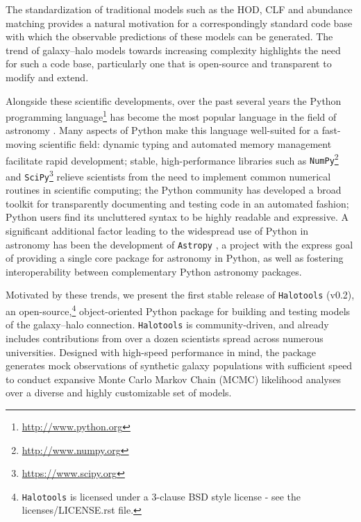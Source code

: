 \documentclass[twocolumn, tighten]{aastex6}
\begin{document}
The standardization of traditional models such as the HOD, CLF and abundance matching provides a natural motivation for a correspondingly standard code base with which the observable predictions of these models can be generated. The trend of galaxy--halo models towards increasing complexity highlights the need for such a code base, particularly one that is open-source and transparent to modify and extend.

Alongside these scientific developments, over the past several years the Python programming language\footnote{\url{http://www.python.org}} has become the most popular language in the field of astronomy \citep{momcheva_tollerud15}. Many aspects of Python make this language well-suited for a fast-moving scientific field: dynamic typing and automated memory management facilitate rapid development; stable, high-performance libraries such as {\tt NumPy}\footnote{\url{http://www.numpy.org}} \citep{numpy_array} and {\tt SciPy}\footnote{\url{https://www.scipy.org}} \citep{scipy} relieve scientists from the need to implement common numerical routines in scientific computing; the Python community has developed a broad toolkit for transparently documenting and testing code in an automated fashion; Python users find its uncluttered syntax to be highly readable and expressive. A significant additional factor leading to the widespread use of Python in astronomy has been the development of  {\tt Astropy} \citep{astropy}, a project with the express goal of providing a single core package for astronomy in Python, as well as fostering interoperability between complementary Python astronomy packages.

Motivated by these trends, we present the first stable release of {\tt Halotools} (v0.2), an open-source,\footnote{{\tt Halotools} is licensed under a 3-clause BSD style license - see the licenses/LICENSE.rst file.} object-oriented Python package for building and testing models of the galaxy--halo connection. {\tt Halotools} is community-driven, and already includes contributions from over a dozen scientists spread across numerous universities. Designed with high-speed performance in mind, the package generates mock observations of synthetic galaxy populations with sufficient speed to conduct expansive  Monte Carlo Markov Chain (MCMC) likelihood analyses over a diverse and highly customizable set of models.
\end{document}
